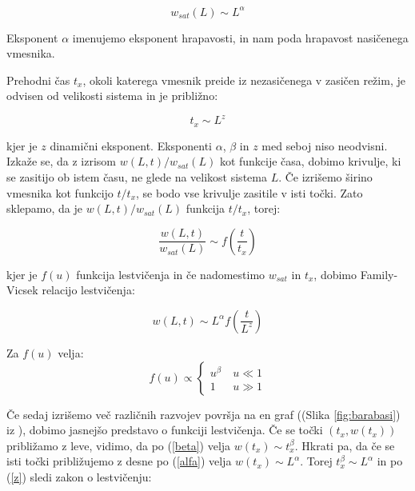 \documentclass[a4paper, oneside, 12pt]{book}
\begin{document}
        \begin{equation}
          w_{sat}(L) \sim L^\alpha
          \label{alfa}
        \end{equation}

        Eksponent $\alpha$ imenujemo eksponent hrapavosti, in nam poda hrapavost nasičenega vmesnika.

        Prehodni čas $t_x$, okoli katerega vmesnik preide iz nezasičenega v zasičen režim, je odvisen od velikosti sistema in je približno:

        \begin{equation}
          t_x \sim L^z
          \label{z}
        \end{equation}

        kjer je $z$ dinamični eksponent.
        Eksponenti $\alpha$, $\beta$ in $z$ med seboj niso neodvisni.
        Izkaže se, da z izrisom $w(L,t)/w_{sat}(L)$ kot funkcije časa, dobimo krivulje, ki se zasitijo ob istem času, ne glede na velikost sistema $L$.
        Če izrišemo širino vmesnika kot funkcijo $t/t_x$, se bodo vse krivulje zasitile v isti točki.
        Zato sklepamo, da je $w(L,t)/w_{sat}(L)$ funkcija $t/t_x$, torej:

        \begin{equation}
          \frac{w(L,t)}{w_{sat}(L)} \sim f(\frac{t}{t_x})
        \end{equation}

        kjer je $f(u)$ funkcija lestvičenja in če nadomestimo $w_{sat}$ in $t_x$, dobimo Family-Vicsek relacijo lestvičenja:

        \begin{equation}
          w(L,t) \sim L^\alpha f(\frac{t}{L^z})
          \label{family-vicsek}
        \end{equation}

        Za $f(u)$ velja:
        \begin{equation}
          f(u) \propto \left \{ \begin{array}{lr} u^{\beta} & \ u\ll 1 \\
            1 & \ u\gg1\end{array} \right. 
        \end{equation}

            Če sedaj izrišemo več različnih razvojev površja na en graf ((Slika \ref{fig:barabasi}) iz \cite{barabasi1995fractal}), dobimo jasnejšo predstavo o funkciji lestvičenja. Če se točki $(t_x,w(t_x))$ približamo z leve, vidimo, da po (\ref{beta}) velja $w(t_x) \sim t_x^\beta$. Hkrati pa, da če se isti točki približujemo z desne po (\ref{alfa}) velja $w(t_x) \sim L^\alpha$. Torej $t_x^\beta \sim L^\alpha$ in po (\ref{z}) sledi zakon o lestvičenju:
\end{document}
